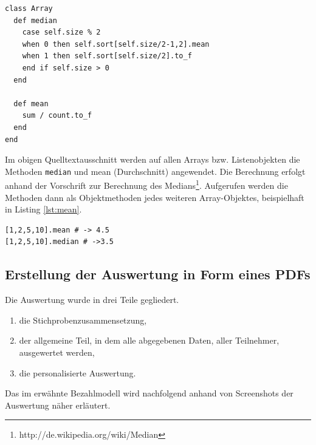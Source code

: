 \lstset{language=ruby}
\begin{lstlisting}[label=lst:median,caption=Auszug: Berechnung des Medians und des Durchschnitts]
class Array
  def median
    case self.size % 2 
    when 0 then self.sort[self.size/2-1,2].mean 
    when 1 then self.sort[self.size/2].to_f 
    end if self.size > 0            
  end

  def mean                                                                                                                                                   
    sum / count.to_f
  end 
end
\end{lstlisting}
Im obigen Quelltextausschnitt werden auf allen Arrays bzw. Listenobjekten die Methoden \texttt{median} und mean (Durchschnitt) angewendet. Die Berechnung erfolgt anhand der Vorschrift zur Berechnung des Medians\footnote{http://de.wikipedia.org/wiki/Median}.
Aufgerufen werden die Methoden dann als Objektmethoden jedes weiteren Array-Objektes, beispielhaft in Listing \ref{lst:mean}.
\begin{lstlisting}[label=lst:mean,caption=Beispiel des Durchschnitts und des Medians]
[1,2,5,10].mean # -> 4.5
[1,2,5,10].median # ->3.5
\end{lstlisting}
\newpage
\subsection{Erstellung der Auswertung in Form eines PDFs}
\label{sec:pdf_auswertung}
Die Auswertung wurde in drei Teile gegliedert. 
\begin{enumerate}
 \item die Stichprobenzusammensetzung,
 \item der allgemeine Teil, in dem alle abgegebenen Daten, aller Teilnehmer, ausgewertet werden,
 \item die personalisierte Auswertung.
\end{enumerate}
Das im
 erwähnte Bezahlmodell wird nachfolgend anhand von
Screenshots der Auswertung näher erläutert. 
